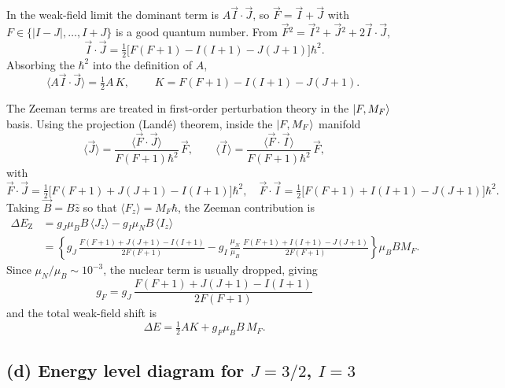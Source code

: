 \documentclass[11pt]{article}
\begin{document}
In the weak-field limit the dominant term is $A\vec I\cdot\vec J$, so $\vec F=\vec I+\vec J$ with $F\in\{|I-J|,\ldots,I+J\}$ is a good quantum number. From $\vec F{}^2=\vec I{}^2+\vec J{}^2+2\vec I\cdot\vec J$,
\begin{equation*}
    \vec I\cdot\vec J = \tfrac12\bigl[F(F+1)-I(I+1)-J(J+1)\bigr]\hbar^2.
\end{equation*}
Absorbing the $\hbar^2$ into the definition of $A$,
\begin{equation*}
    \langle A\vec I\cdot\vec J\rangle = \tfrac12 A\,K,\qquad \boxed{\;K=F(F+1)-I(I+1)-J(J+1).\;}
\end{equation*}

The Zeeman terms are treated in first-order perturbation theory in the $\ket{F,M_F}$ basis. Using the projection (Land\'e) theorem, inside the $\ket{F,M_F}$ manifold
\begin{equation*}
    \langle\vec J\rangle = \frac{\langle\vec F\cdot\vec J\rangle}{F(F+1)\hbar^2}\,\vec F,\qquad
    \langle\vec I\rangle = \frac{\langle\vec F\cdot\vec I\rangle}{F(F+1)\hbar^2}\,\vec F,
\end{equation*}
with
\begin{equation*}
    \vec F\cdot\vec J = \tfrac12\bigl[F(F+1)+J(J+1)-I(I+1)\bigr]\hbar^2,\quad
    \vec F\cdot\vec I = \tfrac12\bigl[F(F+1)+I(I+1)-J(J+1)\bigr]\hbar^2.
\end{equation*}
Taking $\vec B=B\hat z$ so that $\langle F_z\rangle=M_F\hbar$, the Zeeman contribution is
\begin{align*}
    \Delta E_\text{Z} &= g_J\mu_B B\,\langle J_z\rangle - g_I\mu_N B\,\langle I_z\rangle \\
    &= \left\{g_J\,\frac{F(F+1)+J(J+1)-I(I+1)}{2F(F+1)} - g_I\,\frac{\mu_N}{\mu_B}\,\frac{F(F+1)+I(I+1)-J(J+1)}{2F(F+1)}\right\}\mu_B B M_F.
\end{align*}
Since $\mu_N/\mu_B\sim 10^{-3}$, the nuclear term is usually dropped, giving
\begin{equation*}
    \boxed{\;g_F = g_J\,\frac{F(F+1)+J(J+1)-I(I+1)}{2F(F+1)}\;}
\end{equation*}
and the total weak-field shift is
\begin{equation*}
    \Delta E = \tfrac12 A K + g_F\mu_B B\, M_F.
\end{equation*}

\subsection*{(d) Energy level diagram for $J=3/2$, $I=3$}
\end{document}
